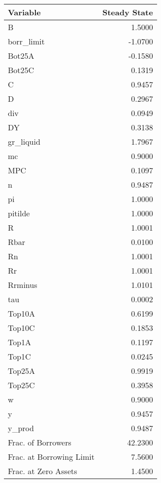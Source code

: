 \begin{table}
\centering
\label{tab:stst}
\begin{tabular}{lr}
\toprule
                Variable &  Steady State \\
\midrule
                       B &        1.5000 \\
              borr\_limit &       -1.0700 \\
                  Bot25A &       -0.1580 \\
                  Bot25C &        0.1319 \\
                       C &        0.9457 \\
                       D &        0.2967 \\
                     div &        0.0949 \\
                      DY &        0.3138 \\
               gr\_liquid &        1.7967 \\
                      mc &        0.9000 \\
                     MPC &        0.1097 \\
                       n &        0.9487 \\
                      pi &        1.0000 \\
                 pitilde &        1.0000 \\
                       R &        1.0001 \\
                    Rbar &        0.0100 \\
                      Rn &        1.0001 \\
                      Rr &        1.0001 \\
                 Rrminus &        1.0101 \\
                     tau &        0.0002 \\
                  Top10A &        0.6199 \\
                  Top10C &        0.1853 \\
                   Top1A &        0.1197 \\
                   Top1C &        0.0245 \\
                  Top25A &        0.9919 \\
                  Top25C &        0.3958 \\
                       w &        0.9000 \\
                       y &        0.9457 \\
                  y\_prod &        0.9487 \\
      Frac. of Borrowers &       42.2300 \\
Frac. at Borrowing Limit &        7.5600 \\
    Frac. at Zero Assets &        1.4500 \\
\bottomrule
\end{tabular}
\end{table}
